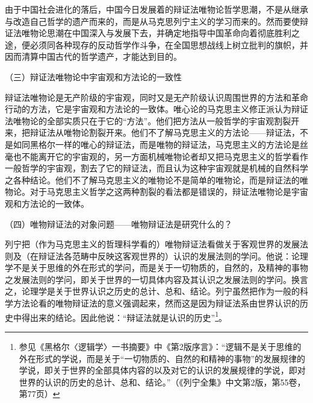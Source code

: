\documentclass[UTF8, 12pt, a4paper]{ctexrep}
\begin{document}
由于中国社会进化的落后，中国今日发展着的辩证法唯物论哲学思潮，不是从继承与改造自己哲学的遗产而来的，而是从马克思列宁主义的学习而来的。然而要使辩证法唯物论思潮在中国深入与发展下去，并确定地指导中国革命向着彻底胜利之途，便必须同各种现存的反动哲学作斗争，在全国思想战线上树立批判的旗帜，并因而清算中国古代的哲学遗产，才能达到目的。

（三）辩证法唯物论中宇宙观和方法论的一致性

辩证法唯物论是无产阶级的宇宙观，同时又是无产阶级认识周围世界的方法和革命行动的方法，它是宇宙观和方法论的一致体。唯心论的马克思主义修正派认为辩证法唯物论的全部实质只在于它的“方法”。他们把方法从一般哲学的宇宙观割裂开来，把辩证法从唯物论割裂开来。他们不了解马克思主义的方法论——辩证法，不是如同黑格尔一样的唯心的辩证法，而是唯物的辩证法，马克思主义的方法论是丝毫也不能离开它的宇宙观的，另一方面机械唯物论者却又把马克思主义的哲学看作一般哲学的宇宙观，割去了它的辩证法，而且认为这种宇宙观就是机械的自然科学之各种结论。他们不了解马克思主义的唯物论不是简单的唯物论，而是辩证法的唯物论。对于马克思主义哲学之这两种割裂的看法都是错误的，辩证法唯物论是宇宙观和方法论的一致体。

（四）唯物辩证法的对象问题——唯物辩证法是研究什么的？

列宁把（作为马克思主义的哲理科学看的）唯物辩证法看做关于客观世界的发展法则及（在辩证法各范畴中反映这客观世界的）认识的发展法则的学问。他说：论理学不是关于思维的外在形式的学问，而是关于一切物质的，自然的，及精神的事物之发展法则的学问，即关于世界的一切具体内容及其认识之发展法则的学问。换言之，论理学是关于世界认识之历史的总计、总和、结论。列宁虽然把作为一般的科学方法论看的唯物辩证法的意义强调起来，然而这是因为辩证法系由世界认识的历史中得出来的结论。因此他说：“辩证法就是认识的历史”\footnote{参见《黑格尔〈逻辑学〉一书摘要》中《第2版序言》：“逻辑不是关于思维的外在形式的学说，而是关于“一切物质的、自然的和精神的事物”的发展规律的学说，即关于世界的全部具体内容的以及对它的认识的发展规律的学说，即对世界的认识的历史的总计、总和、结论。”（《列宁全集》中文第2版，第55卷，第77页）}。
\end{document}
